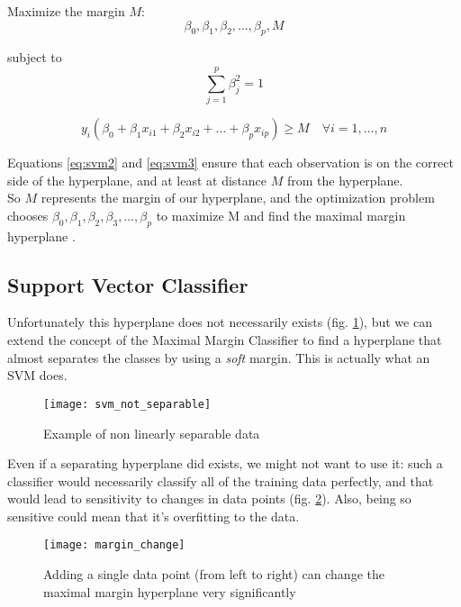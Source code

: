 Maximize the margin $M$:
\begin{equation} \label{eq:svm1}
	\beta_0, \beta_1, \beta_2, \dots, \beta_p, M
\end{equation}

subject to
\begin{equation} \label{eq:svm2}
	\sum_{j=1}^{p}\beta^2_j = 1
\end{equation}

\begin{equation} \label{eq:svm3}
	y_i(\beta_0 + \beta_1 x_{i1} + \beta_2 x_{i2} + \dots + \beta_p x_{ip}) \ge M \quad \forall i = 1, \dots, n
\end{equation}

Equations \ref{eq:svm2} and \ref{eq:svm3} ensure that each observation is on the correct side of the hyperplane, and at least at distance $M$ from the hyperplane. \\
So $M$ represents the margin of our hyperplane, and the optimization problem chooses $\beta_0, \beta_1, \beta_2, \beta_3, \dots, \beta_p$ to maximize M and find the maximal margin hyperplane \cite{ISLR}.

\subsection{Support Vector Classifier}
Unfortunately this hyperplane does not necessarily exists (fig. \ref{fig:svmnotsep}), but we can extend the concept of the Maximal Margin Classifier to find a hyperplane that almost separates the classes by using a \textit{soft} margin. This is actually what an SVM does.

\begin{figure}[H]
	\centering
	\texttt{[image: svm\_not\_separable]}
	\caption{Example of non linearly separable data \cite{svm_not_sep}}
	\label{fig:svmnotsep}
\end{figure}

Even if a separating hyperplane did exists, we might not want to use it: such a classifier would necessarily  classify all of the training data perfectly, and that would lead to sensitivity to changes in data points (fig. \ref{fig:margin_change}). Also, being so sensitive could mean that it's overfitting to the data. 

\begin{figure}[H]
	\centering
	\texttt{[image: margin\_change]}
	\caption{Adding a single data point (from left to right) can change the maximal margin hyperplane very significantly \cite{ISLR}}
	\label{fig:margin_change}
\end{figure}

